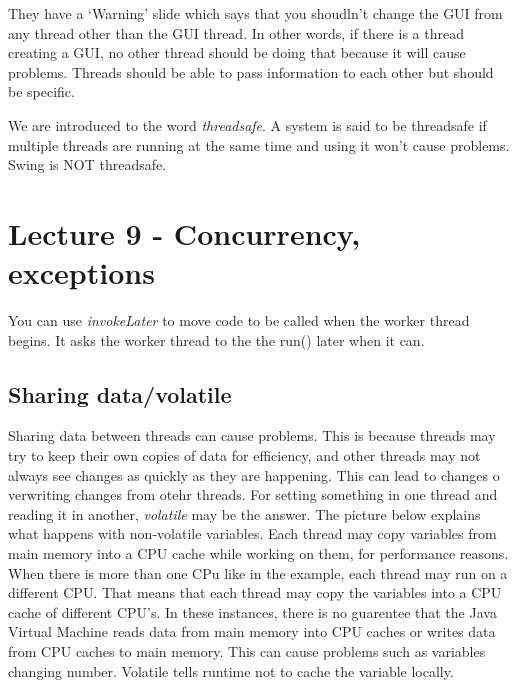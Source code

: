 \documentclass{article}
\begin{document}
They have a `Warning' slide which says that you shoudln't change the GUI from any thread other than
the GUI thread. In other words, if there is a thread creating a GUI, no other thread should be doing that 
because it will cause problems. Threads should be able to pass information to each other but should
be specific.


We are introduced to the word \emph{threadsafe}. A system is said to be threadsafe if multiple threads are 
running at the same time and using it won't cause problems. Swing is NOT threadsafe.

\section{Lecture 9 - Concurrency, exceptions}

You can use \emph{invokeLater} to move code to be called when the worker thread begins. It asks the
worker thread to the the run() later when it can.

\subsection{Sharing data/volatile}

Sharing data between threads can cause problems. This is because threads may try to keep their own copies
of data for efficiency, and other threads may not always see changes as quickly as they are happening.
This can lead to changes o verwriting changes from otehr threads. For setting something in one thread and
reading it in another, \emph{volatile} may be the answer. The picture below explains what happens with
non-volatile variables. Each thread may copy variables from main memory into a CPU cache while working on 
them, for performance reasons. When there is more than one CPu like in the example, each thread may run on a different CPU. That means that each thread may copy the variables into a CPU cache of different CPU's. In these
instances, there is no guarentee that the Java Virtual Machine reads data from main memory into CPU caches
or writes data from CPU caches to main memory. This can cause problems such as variables changing number.
Volatile tells runtime not to cache the variable locally. 
\end{document}
